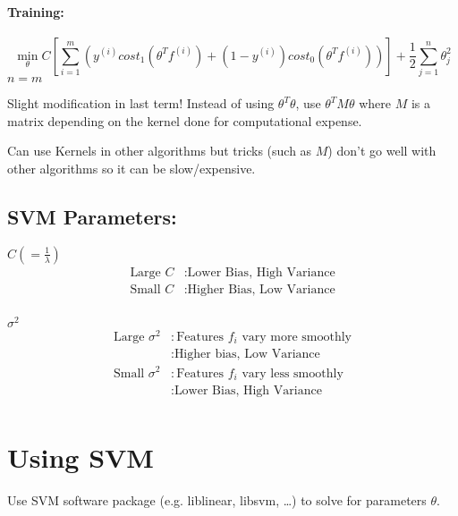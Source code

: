 \paragraph{Training:}
\begin{equation*}
	\min_\theta C\left[
	\sum_{i=1}^m \left(
	y^{(i)}{cost}_1(\theta^Tf^{(i)}) +
	(1 - y^{(i)}){cost}_0(\theta^Tf^{(i)})
	\right)
	\right] + \frac{1}{2}\sum_{j=1}^n\theta_j^2
\end{equation*}
$n = m$

Slight modification in last term!
Instead of using $\theta^T\theta$, use $\theta^TM\theta$ where $M$ is a matrix depending
on the kernel done for computational expense.

Can use Kernels in other algorithms but tricks (such as $M$) don't go well with other algorithms
so it can be slow/expensive.

\subsection{SVM Parameters:}
$C \left(=\frac{1}{\lambda}\right)$
\begin{align*}
	\text{Large } C & : \text{Lower Bias, High Variance} \\
	\text{Small } C & : \text{Higher Bias, Low Variance} \\
\end{align*}

$\sigma^2$
\begin{align*}
	\text{Large } \sigma^2 & : \text{Features $f_i$ vary more smoothly} \\
	                       & : \text{Higher bias, Low Variance}         \\
	\text{Small } \sigma^2 & : \text{Features $f_i$ vary less smoothly} \\
	                       & : \text{Lower Bias, High Variance}         \\
\end{align*}

\section{Using SVM}
Use SVM software package (e.g. liblinear, libsvm, \dots) to solve for parameters $\theta$.

